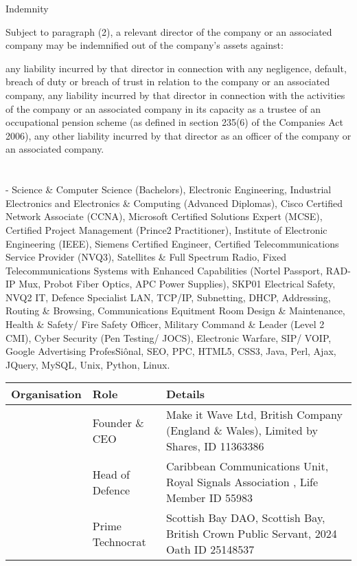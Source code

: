 \documentclass[letterpaper,10pt,english]{sphinxmanual}
\begin{document}
Indemnity

Subject to paragraph (2), a relevant director of the company or an associated company may be indemnified out of the company’s assets against:

any liability incurred by that director in connection with any negligence, default, breach of duty or breach of trust in relation to the company or an associated company,
any liability incurred by that director in connection with the activities of the company or an associated company in its capacity as a trustee of an occupational pension scheme (as defined in section 235(6) of the Companies Act 2006),
any other liability incurred by that director as an officer of the company or an associated company.


\chapter{}
\label{\detokenize{index:document-author-s}}
 - Science \& Computer Science (Bachelors), Electronic Engineering, Industrial Electronics and Electronics \& Computing (Advanced Diplomas), Cisco Certified Network Associate (CCNA), Microsoft Certified Solutions Expert (MCSE), Certified Project Management (Prince2 Practitioner), Institute of Electronic Engineering (IEEE), Siemens Certified Engineer, Certified Telecommunications Service Provider (NVQ3), Satellites \& Full Spectrum Radio, Fixed Telecommunications Systems with Enhanced Capabilities (Nortel Passport, RAD-IP Mux, Probot Fiber Optics, APC Power Supplies), SKP01 Electrical Safety, NVQ2 IT, Defence Specialist LAN, TCP/IP, Subnetting, DHCP, Addressing, Routing \& Browsing, Communications Equitment Room Design \& Maintenance, Health \& Safety/ Fire Safety Officer, Military Command \& Leader (Level 2 CMI),  Cyber Security (Pen Testing/ JOCS), Electronic Warfare, SIP/ VOIP, Google Advertising ProfesSiônal, SEO, PPC, HTML5, CSS3, Java, Perl, Ajax, JQuery, MySQL, Unix, Python, Linux.


\begin{savenotes}\sphinxattablestart
\centering
\begin{tabulary}{\linewidth}[t]{|T|T|T|}
\hline
\sphinxstyletheadfamily 
Organisation
&\sphinxstyletheadfamily 
Role
&\sphinxstyletheadfamily 
Details
\\
\hline
\noindent{}
&
Founder \& CEO
&
Make it Wave Ltd, British Company (England \& Wales), Limited by Shares, ID 11363386
\\
\hline
\noindent{}
&
Head of Defence
&
Caribbean Communications Unit, Royal Signals Association , Life Member ID 55983
\\
\hline
\noindent{}
&
Prime Technocrat
&
Scottish Bay DAO, Scottish Bay, British Crown Public Servant, 2024 Oath ID 25148537
\\
\hline
\end{tabulary}
\par
\sphinxattableend\end{savenotes}



\renewcommand{\indexname}{Index}
\printindex
\end{document}
